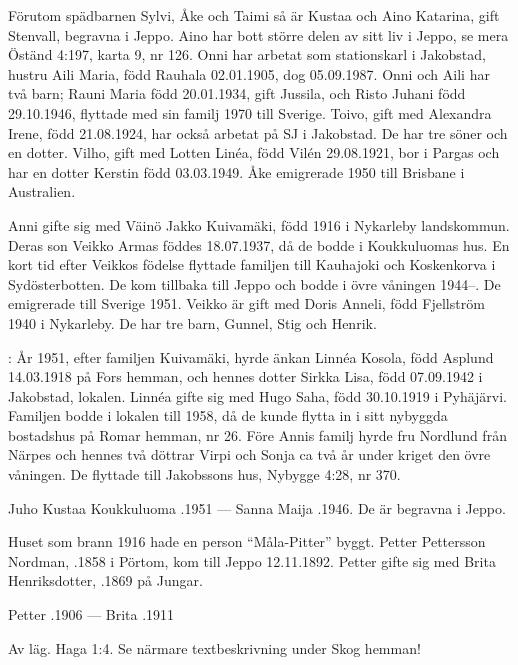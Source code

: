 Förutom spädbarnen Sylvi, Åke och Taimi så är Kustaa och Aino	Katarina, gift Stenvall, begravna i Jeppo. Aino har bott större delen av sitt liv i Jeppo, se mera Öständ 4:197, karta 9, nr 126. Onni har arbetat som 	stationskarl i Jakobstad, hustru Aili Maria, född Rauhala 02.01.1905, dog	05.09.1987. Onni och Aili har två barn; Rauni Maria född 20.01.1934, gift Jussila, och Risto Juhani född 29.10.1946, flyttade med sin familj 1970	till Sverige. Toivo, gift med Alexandra Irene, född 21.08.1924, har också	arbetat på SJ i Jakobstad. De har tre söner och en dotter. Vilho, gift med	Lotten Linéa, född Vilén 29.08.1921, bor i Pargas och har en dotter	Kerstin född 03.03.1949. Åke emigrerade 1950 till Brisbane i Australien.

Anni gifte sig med Väinö Jakko Kuivamäki, född 1916 i Nykarleby landskommun. Deras son Veikko Armas föddes 18.07.1937, då de bodde i Koukkuluomas hus. En kort tid efter Veikkos födelse flyttade familjen till Kauhajoki och Koskenkorva i Sydösterbotten. De kom tillbaka till Jeppo och bodde i övre våningen 1944--. De emigrerade till Sverige 1951. Veikko är gift med Doris Anneli, född Fjellström 1940 i Nykarleby. De har tre barn, Gunnel, Stig och Henrik.

:
År 1951, efter familjen Kuivamäki, hyrde änkan Linnéa Kosola, född Asplund 14.03.1918 på Fors hemman, och hennes dotter Sirkka Lisa, född 07.09.1942 i Jakobstad, lokalen. Linnéa gifte sig med	Hugo Saha, född 30.10.1919 i Pyhäjärvi. Familjen bodde i lokalen till 1958, då de kunde flytta in i sitt nybyggda bostadshus på Romar hemman, nr 26. Före Annis familj hyrde fru Nordlund från Närpes och hennes två döttrar Virpi och Sonja ca två år under kriget den övre våningen. De flyttade till Jakobssons hus, Nybygge 4:28, nr 370.

Juho Kustaa Koukkuluoma .1951  ---  Sanna Maija .1946. De är begravna i Jeppo.

Huset som brann 1916 hade en person ``Måla-Pitter'' byggt. Petter Pettersson Nordman, .1858 i Pörtom, kom till Jeppo 12.11.1892. Petter gifte sig med Brita Henriksdotter, .1869 på Jungar.

Petter .1906  ---  Brita .1911




Av läg. Haga 1:4.
Se närmare textbeskrivning under Skog hemman!\jhvspace{}
